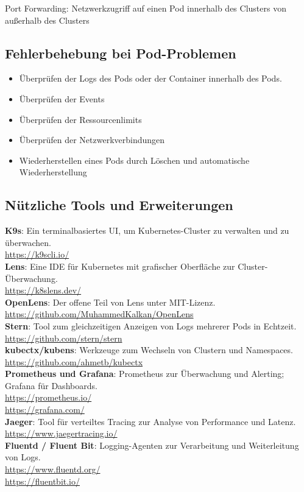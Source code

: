 Port Forwarding: Netzwerkzugriff auf einen Pod innerhalb des Clusters von außerhalb des Clusters

\subsection{Fehlerbehebung bei Pod-Problemen}
\begin{itemize}
    \item Überprüfen der Logs des Pods oder der Container innerhalb des Pods.
    \item Überprüfen der Events
    \item Überprüfen der Ressourcenlimits
    \item Überprüfen der Netzwerkverbindungen
    \item Wiederherstellen eines Pods durch Löschen und automatische Wiederherstellung
\end{itemize}

\newpage

\subsection{Nützliche Tools und Erweiterungen}
\textbf{K9s}: Ein terminalbasiertes UI, um Kubernetes-Cluster zu verwalten und zu überwachen.\\
\url{https://k9scli.io/}\\
\textbf{Lens}: Eine IDE für Kubernetes mit grafischer Oberfläche zur Cluster-Überwachung.\\
\url{https://k8slens.dev/}\\
\textbf{OpenLens}: Der offene Teil von Lens unter MIT-Lizenz.\\
\url{https://github.com/MuhammedKalkan/OpenLens}\\
\textbf{Stern}: Tool zum gleichzeitigen Anzeigen von Logs mehrerer Pods in Echtzeit.\\
\url{https://github.com/stern/stern}\\
\textbf{kubectx/kubens}: Werkzeuge zum Wechseln von Clustern und Namespaces.\\
\url{https://github.com/ahmetb/kubectx}\\
\textbf{Prometheus und Grafana}: Prometheus zur Überwachung und Alerting; Grafana für Dashboards.\\
\url{https://prometheus.io/}\\
\url{https://grafana.com/}\\
\textbf{Jaeger}: Tool für verteiltes Tracing zur Analyse von Performance und Latenz.\\
\url{https://www.jaegertracing.io/}\\
\textbf{Fluentd / Fluent Bit}: Logging-Agenten zur Verarbeitung und Weiterleitung von Logs.\\
\url{https://www.fluentd.org/}\\
\url{https://fluentbit.io/}

